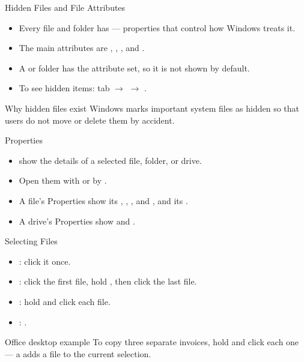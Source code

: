 \documentclass[aspectratio=169]{beamer}
\begin{document}
\begin{frame}{Hidden Files and File Attributes}
  \begin{itemize}
    \item Every file and folder has  --- properties that
      control how Windows treats it.
    \item The main attributes are , ,
      , and .
    \item A  or folder has the  attribute set, so
      it is not shown by default.
    \item To see hidden items:  tab $\rightarrow$ 
      $\rightarrow$ .
  \end{itemize}
  \begin{block}{Why hidden files exist}
    Windows marks important system files as hidden so that users do not move
    or delete them by accident.
  \end{block}
\end{frame}

\begin{frame}{Properties}
  \begin{itemize}
    \item {} show the details of a selected file, folder, or
      drive.
    \item Open them with  or by
      .
    \item A file's Properties show its , , ,  and , and its
      .
    \item A drive's Properties show  and .
  \end{itemize}
\end{frame}

\begin{frame}{Selecting Files}
  \begin{itemize}
    \item {}: click it once.
    \item {}: click the first file, hold , then
      click the last file.
    \item {}: hold  and click each file.
    \item {}: .
  \end{itemize}
  \begin{exampleblock}{Office desktop example}
    To copy three separate invoices, hold  and click each one --- a
     adds a file to the current selection.
  \end{exampleblock}
\end{frame}
\end{document}
